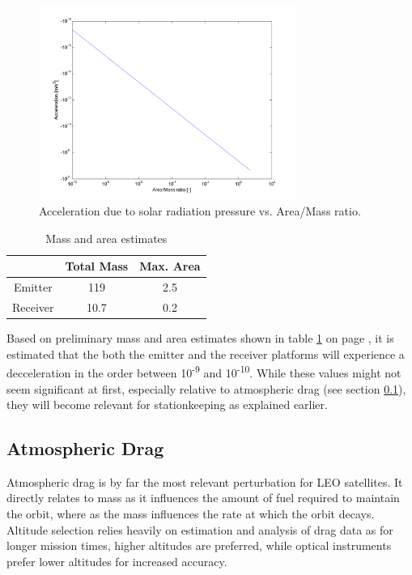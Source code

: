 \begin{figure}[h!]
\centering
\includegraphics[width=0.75\textwidth, angle=0]{chapters/img/solPressureVarRatio.png}
\caption{Acceleration due to solar radiation pressure vs. Area/Mass ratio.}
\label{fig:solarRadRatio}
\end{figure}

\begin{table}[h]
	\centering
		\begin{tabular}{c|c|c}
		 & \textbf{Total Mass} &\textbf{ Max. Area} \\ \hline \hline
		 Emitter & 119 & 2.5 \\ 
		 Receiver & 10.7 & 0.2 
			
		\end{tabular}
	\caption{Mass and area estimates}
	\label{table:solarEstimates}
\end{table}

Based on preliminary mass and area estimates shown in table \ref{table:solarEstimates} on page \pageref{table:solarEstimates}, it is estimated that the both the emitter and the receiver platforms will experience a decceleration in the order between 10\textsuperscript{-9} and 10\textsuperscript{-10}. While these values might not seem significant at first, especially relative to atmospheric drag (see section \ref{mtrAtmDrag}), they will become relevant for stationkeeping as explained earlier.

\subsection{Atmospheric Drag}
\label{mtrAtmDrag}
Atmospheric drag is by far the most relevant perturbation for \ac{LEO} satellites. It directly relates to mass as it influences the amount of fuel required to maintain the orbit, where as the mass influences the rate at which the orbit decays. Altitude selection relies heavily on estimation and analysis of drag data as for longer mission times, higher altitudes are preferred, while optical instruments prefer lower altitudes for increased accuracy.

